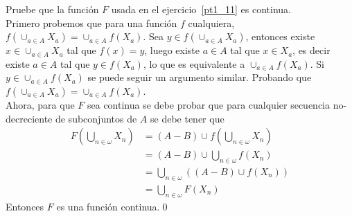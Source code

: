 \item Pruebe que la función \(F\) usada en el ejercicio~\ref{pt1_11} es continua. \\
    Primero probemos que para una función \(f\) cualquiera, \(f\left(\cup_{a \in A} X_a\right) = \cup_{a \in A} f\left(X_a\right)\).
    Sea \(y \in f\left(\cup_{a \in A} X_a\right)\), entonces existe \(x \in \cup_{a \in A} X_a\) tal que \(f(x) = y\), 
    luego existe \(a \in A\) tal que \(x \in X_a\), es decir existe \(a \in A\) tal que \(y \in f(X_a)\), lo que es equivalente a
    \(\cup_{a \in A} f(X_a)\). Si \(y \in \cup_{a \in A} f(X_a)\) se puede seguir un argumento similar. 
    Probando que \(f\left(\cup_{a \in A} X_a\right) = \cup_{a \in A} f\left(X_a\right)\). \\
    Ahora, para que \(F\) sea continua se debe probar que para cualquier secuencia no-decreciente de subconjuntos de \(A\) se debe tener que
    \[
        \begin{aligned}
            F\left(\bigcup_{n \in \omega} X_n\right) 
                &= (A - B) \cup f\left(\bigcup_{n \in \omega} X_n\right) \\
                &= (A - B) \cup \bigcup_{n \in \omega} f\left(X_n\right) \\
                &= \bigcup_{n \in \omega} \left((A - B) \cup f\left(X_n\right)\right) \\
                &= \bigcup_{n \in \omega} F\left(X_n\right)
        \end{aligned}
    \]
    Entonces \(F\) es una función continua.\qed{}

